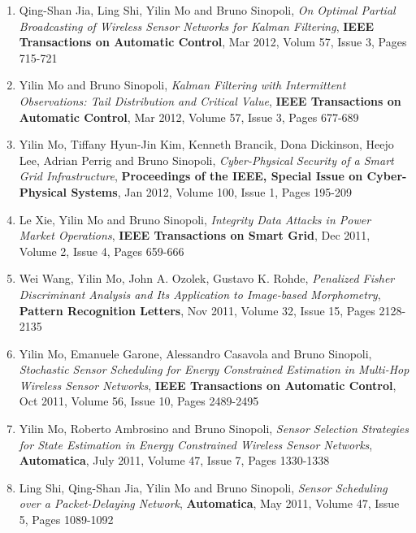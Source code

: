 \documentclass[10pt, a4paper]{article}
\begin{document}
\begin{enumerate}
\item Qing-Shan Jia, Ling Shi, Yilin Mo and Bruno Sinopoli, \emph{{On Optimal Partial Broadcasting of Wireless Sensor Networks for Kalman Filtering}}, \textbf{IEEE Transactions on Automatic Control}, Mar 2012, Volum 57, Issue 3, Pages 715-721
\item Yilin Mo and Bruno Sinopoli, \emph{{Kalman Filtering with Intermittent Observations: Tail Distribution and Critical Value}}, \textbf{IEEE Transactions on Automatic Control}, Mar 2012, Volume 57, Issue 3, Pages 677-689
\item Yilin Mo, Tiffany Hyun-Jin Kim, Kenneth Brancik, Dona Dickinson, Heejo Lee, Adrian Perrig and Bruno Sinopoli, \emph{{Cyber-Physical Security of a Smart Grid Infrastructure}}, \textbf{Proceedings of the IEEE, Special Issue on Cyber-Physical Systems}, Jan 2012, Volume 100, Issue 1, Pages 195-209
\item Le Xie, Yilin Mo and Bruno Sinopoli, \emph{{Integrity Data Attacks in Power Market Operations}}, \textbf{IEEE Transactions on Smart Grid}, Dec 2011, Volume 2, Issue 4, Pages 659-666
\item Wei Wang, Yilin Mo, John A. Ozolek, Gustavo K. Rohde, \emph{{Penalized Fisher Discriminant Analysis and Its Application to Image-based Morphometry}}, \textbf{Pattern Recognition Letters}, Nov 2011, Volume 32, Issue 15, Pages 2128-2135
\item Yilin Mo, Emanuele Garone, Alessandro Casavola and Bruno Sinopoli, \emph{{Stochastic Sensor Scheduling for Energy Constrained Estimation in Multi-Hop Wireless Sensor Networks}}, \textbf{IEEE Transactions on Automatic Control}, Oct 2011, Volume 56, Issue 10, Pages 2489-2495
\item Yilin Mo, Roberto Ambrosino and Bruno Sinopoli, \emph{{Sensor Selection Strategies for State Estimation in Energy Constrained Wireless Sensor Networks}}, \textbf{Automatica}, July 2011, Volume 47, Issue 7, Pages 1330-1338
\item Ling Shi, Qing-Shan Jia, Yilin Mo and Bruno Sinopoli, \emph{{Sensor Scheduling over a Packet-Delaying Network}}, \textbf{Automatica}, May 2011, Volume 47, Issue 5, Pages 1089-1092
\end{enumerate}
\end{document}
